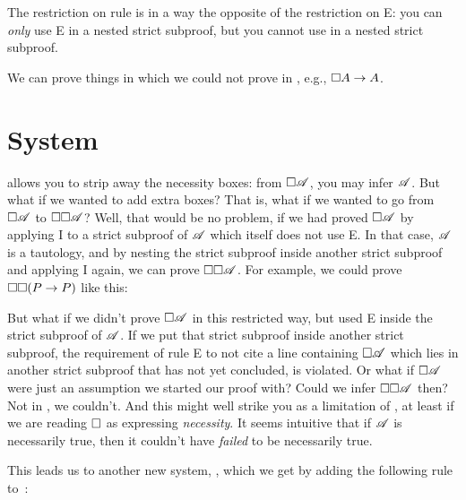 The restriction on rule \mlT{} is in a way the opposite of the restriction on \ebox E: you can \emph{only} use \ebox E in a nested strict subproof, but you cannot use \mlT{} in a nested strict subproof.

We can prove things in \mlT{} which we could not prove in \mlK, e.g., $\Box A \rightarrow A$.

\section{System \mlSfour}
\label{S4}

\mlT{} allows you to strip away the necessity boxes: from $\Box \mathscr{A}$, you may infer $\mathscr{A}$. But what if we wanted to add extra boxes? That is, what if we wanted to go from $\Box\mathscr{A}$ to $\Box\Box\mathscr{A}$? Well, that would be no problem, if we had proved $\Box\mathscr{A}$ by applying \ebox I to a strict subproof of $\mathscr{A}$ which itself does not use \ebox E. In that case, $\mathscr{A}$ is a tautology, and by nesting the strict subproof inside another strict subproof and applying \ebox I again, we can prove $\Box\Box \mathscr{A}$. For example, we could prove $\Box\Box (P\rightarrow P)$ like this:
\begin{fitchproof}
		\open
		\AS
		\open
		\AS
		\open
		\AS
		\close
		\close
		\close
\end{fitchproof}
But what if we didn't prove $\Box\mathscr{A}$ in this restricted way, but used \ebox E inside the strict subproof of $\mathscr{A}$. If we put that strict subproof inside another strict subproof, the requirement of rule \ebox E to not cite a line containing $\Box\mathscr{A}$ which lies in another strict subproof that has not yet concluded, is violated.  Or what if $\Box\mathscr{A}$ were just an assumption we started our proof with? Could we infer $\Box\Box\mathscr{A}$ then? Not in  \mlT, we couldn't. And this might well strike you as a limitation of  \mlT, at least if we are reading $\Box$ as expressing \emph{necessity}. It seems intuitive that if $\mathscr{A}$ is necessarily true, then it couldn't have \emph{failed} to be necessarily true.

This leads us to another new system, \mlSfour, which we get by adding the following rule to~\mlT:


